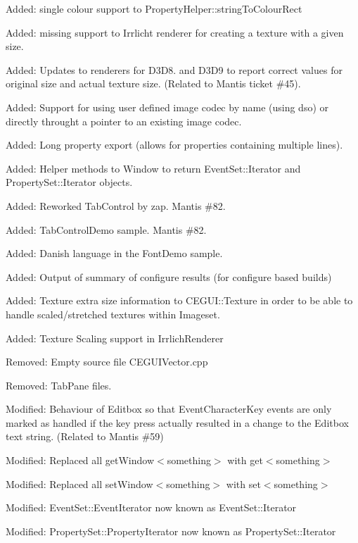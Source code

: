 \begin{DoxyItemize}
\item Added\+: single colour support to Property\+Helper\+::string\+To\+Colour\+Rect
\item Added\+: missing support to Irrlicht renderer for creating a texture with a given size.
\item Added\+: Updates to renderers for D3\+D8. and D3\+D9 to report correct values for \textquotesingle{}original\textquotesingle{} size and actual texture size. (Related to Mantis ticket \#45).
\item Added\+: Support for using user defined image codec by name (using dso) or directly throught a pointer to an existing image codec.
\item Added\+: Long property export (allows for properties containing multiple lines).
\item Added\+: Helper methods to Window to return Event\+Set\+::\+Iterator and Property\+Set\+::\+Iterator objects.
\item Added\+: Reworked Tab\+Control by zap. Mantis \#82.
\item Added\+: Tab\+Control\+Demo sample. Mantis \#82.
\item Added\+: Danish language in the Font\+Demo sample.
\item Added\+: Output of summary of configure results (for configure based builds)
\item Added\+: Texture extra size information to C\+E\+G\+U\+I\+::\+Texture in order to be able to handle scaled/stretched textures within Imageset.
\item Added\+: Texture Scaling support in Irrlich\+Renderer
\item Removed\+: Empty source file C\+E\+G\+U\+I\+Vector.\+cpp
\item Removed\+: Tab\+Pane files.
\item Modified\+: Behaviour of Editbox so that Event\+Character\+Key events are only marked as handled if the key press actually resulted in a change to the Editbox text string. (Related to Mantis \#59)
\item Modified\+: Replaced all get\+Window$<$something$>$ with get$<$something$>$
\item Modified\+: Replaced all set\+Window$<$something$>$ with set$<$something$>$
\item Modified\+: Event\+Set\+::\+Event\+Iterator now known as Event\+Set\+::\+Iterator
\item Modified\+: Property\+Set\+::\+Property\+Iterator now known as Property\+Set\+::\+Iterator

\end{DoxyItemize}
